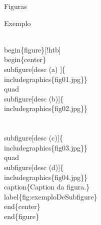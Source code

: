 \begin{frame}{Figuras}
\begin{exampleblock}{Exemplo}
\begin{semiverbatim}
\\begin\{figure\}[!htb]
  \\begin\{center\}
    \\subfigure[desc (a) ]\{\\includegraphics\{fig01.jpg\}\}\\quad
    \\subfigure[desc (b)]\{\\includegraphics\{fig02.jpg\}\} \\\\
    \\subfigure[desc (c)]\{\\includegraphics\{fig03.jpg\}\} \\quad
    \\subfigure[desc (d)]\{\\includegraphics\{fig04.jpg\}\}
  \\caption\{Caption da figura.\}\\label\{fig:exemploDeSubfigure\}
  \\end\{center\}
\\end\{figure\}
\end{semiverbatim}
    \end{exampleblock}
\end{frame}


